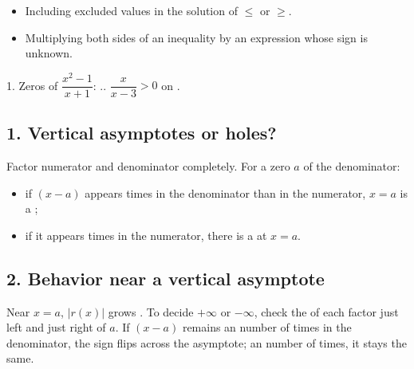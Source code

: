 \begin{mistakes}
\begin{itemize}
\item Including excluded values in the solution of $\le$ or $\ge$.
\item Multiplying both sides of an inequality by an expression whose sign is unknown.
\end{itemize}
\end{mistakes}

\begin{quickcheck}
1. Zeros of $\dfrac{x^2-1}{x+1}$: .. $\dfrac{x}{x-3}>0$ on .
\end{quickcheck}


\subsection*{1. Vertical asymptotes or holes?}
\begin{keyidea}
Factor numerator and denominator completely. For a zero $a$ of the denominator:
\begin{itemize}
\item if $(x-a)$ appears  times in the denominator than in the numerator, $x=a$ is a ;
\item if it appears  times in the numerator, there is a  at $x=a$.
\end{itemize}
\end{keyidea}

\subsection*{2. Behavior near a vertical asymptote}
Near $x=a$, $|r(x)|$ grows . To decide $+\infty$ or $-\infty$, check the  of each factor just left and just right of $a$. If $(x-a)$ remains an  number of times in the denominator, the sign flips across the asymptote; an  number of times, it stays the same.

